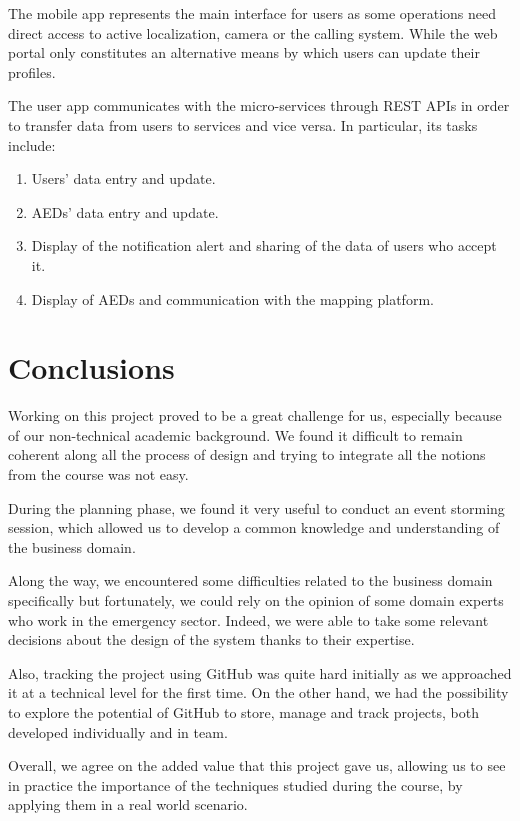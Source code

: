 \documentclass[11pt,a4paper]{article}
\begin{document}
The mobile app represents the main interface for users as some operations need direct access to active localization, camera or the calling system.
%
While the web portal only constitutes an alternative means by which users can update their profiles.

The user app communicates with the micro-services through REST APIs in order to transfer data from users to services and vice versa.
%
In particular, its tasks include:

\begin{enumerate}
    \item Users' data entry and update.
    \item AEDs' data entry and update.
    \item Display of the notification alert and sharing of the data of users who accept it.
    \item Display of AEDs and communication with the mapping platform.
\end{enumerate}

\section{Conclusions}
Working on this project proved to be a great challenge for us, especially because of our non-technical academic background.
%
We found it difficult to remain coherent along all the process of design and trying to integrate all the notions from the course was not easy.

During the planning phase, we found it very useful to conduct an event storming session, which allowed us to develop a common knowledge and understanding of the business domain.

Along the way, we encountered some difficulties related to the business domain specifically but fortunately, we could rely on the opinion of some domain experts who work in the emergency sector.
%
Indeed, we were able to take some relevant decisions about the design of the system thanks to their expertise.

Also, tracking the project using GitHub was quite hard initially as we approached it at a technical level for the first time.
%
On the other hand, we had the possibility to explore the potential of GitHub to store, manage and track projects, both developed individually and in team.

Overall, we agree on the added value that this project gave us, allowing us to see in practice the importance of the techniques studied during the course, by applying them in a real world scenario.
\end{document}
